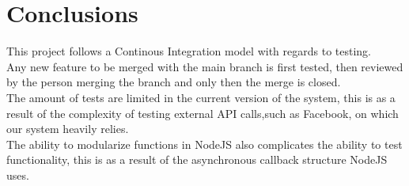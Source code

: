 \documentclass{article}
\begin{document}
\section{Conclusions}
This project follows a Continous Integration model with regards to testing. \\ Any new feature to be merged with the main branch is first tested, then reviewed by the person merging the branch and only then the merge is closed.\\
The amount of tests are limited in the current version of the system, this is as a result of the complexity of testing external API calls,such as Facebook, on which our system heavily relies.\\
The ability to modularize functions in NodeJS also complicates the ability to test functionality, this is as a result of the asynchronous callback structure NodeJS uses.
\end{document}
